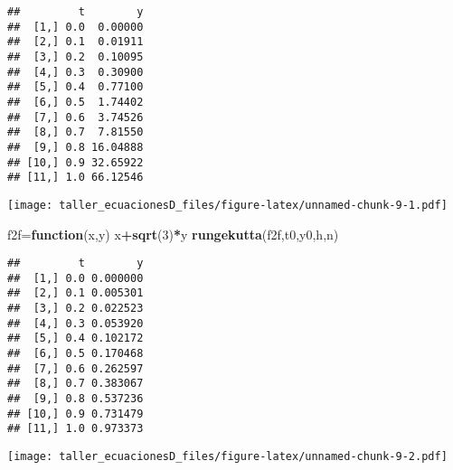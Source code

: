 \documentclass[]{article}
\newenvironment{Shaded}{\begin{snugshade}}{\end{snugshade}}
\newcommand{\KeywordTok}[1]{\textcolor[rgb]{0.13,0.29,0.53}{\textbf{#1}}}
\newcommand{\DecValTok}[1]{\textcolor[rgb]{0.00,0.00,0.81}{#1}}
\newcommand{\ControlFlowTok}[1]{\textcolor[rgb]{0.13,0.29,0.53}{\textbf{#1}}}
\newcommand{\OperatorTok}[1]{\textcolor[rgb]{0.81,0.36,0.00}{\textbf{#1}}}
\newcommand{\NormalTok}[1]{#1}
\begin{document}
\begin{verbatim}
##         t        y
##  [1,] 0.0  0.00000
##  [2,] 0.1  0.01911
##  [3,] 0.2  0.10095
##  [4,] 0.3  0.30900
##  [5,] 0.4  0.77100
##  [6,] 0.5  1.74402
##  [7,] 0.6  3.74526
##  [8,] 0.7  7.81550
##  [9,] 0.8 16.04888
## [10,] 0.9 32.65922
## [11,] 1.0 66.12546
\end{verbatim}

\texttt{[image: taller\_ecuacionesD\_files/figure-latex/unnamed-chunk-9-1.pdf]}

\begin{Shaded}
\begin{Highlighting}[]
\NormalTok{f2f=}\ControlFlowTok{function}\NormalTok{(x,y) x}\OperatorTok{+}\KeywordTok{sqrt}\NormalTok{(}\DecValTok{3}\NormalTok{)}\OperatorTok{*}\NormalTok{y}
\KeywordTok{rungekutta}\NormalTok{(f2f,t0,y0,h,n)}
\end{Highlighting}
\end{Shaded}

\begin{verbatim}
##         t        y
##  [1,] 0.0 0.000000
##  [2,] 0.1 0.005301
##  [3,] 0.2 0.022523
##  [4,] 0.3 0.053920
##  [5,] 0.4 0.102172
##  [6,] 0.5 0.170468
##  [7,] 0.6 0.262597
##  [8,] 0.7 0.383067
##  [9,] 0.8 0.537236
## [10,] 0.9 0.731479
## [11,] 1.0 0.973373
\end{verbatim}

\texttt{[image: taller\_ecuacionesD\_files/figure-latex/unnamed-chunk-9-2.pdf]}
\end{document}
